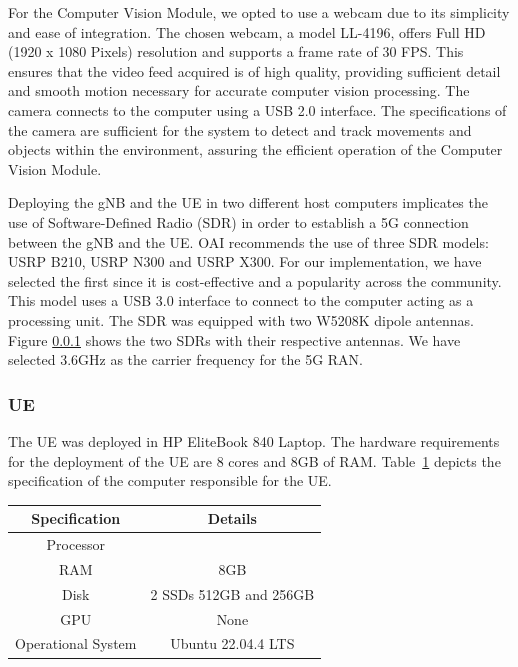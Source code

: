 For the Computer Vision Module, we opted to use a webcam due to its simplicity and ease of integration.
The chosen webcam, a model LL-4196, offers Full HD (1920 x 1080 Pixels) resolution and supports a frame rate of 30 FPS\@.
This ensures that the video feed acquired is of high quality, providing sufficient detail and smooth motion necessary for accurate computer vision processing.
The camera connects to the computer using a USB 2.0 interface.
The specifications of the camera are sufficient for the system to detect and track movements and objects within the environment, assuring the efficient operation of the Computer Vision Module.


Deploying the gNB and the UE in two different host computers implicates the use of Software-Defined Radio (SDR) in order to establish a 5G connection between the gNB and the UE.
OAI recommends the use of three SDR models: USRP B210, USRP N300 and USRP X300\@ \cite{}. %
For our implementation, we have selected the first since it is cost-effective and a popularity across the community.
This model uses a USB 3.0 interface to connect to the computer acting as a processing unit.
The SDR was equipped with two W5208K dipole antennas.
Figure \ref{} shows the two SDRs with their respective antennas.
We have selected 3.6GHz as the carrier frequency for the 5G RAN.

\subsubsection{UE}
The UE was deployed in HP EliteBook 840 Laptop.
The hardware requirements for the deployment of the UE are 8 cores and 8GB of RAM\@.
Table~\ref{tab:specs_pc_ue} depicts the specification of the computer responsible for the UE\@.

\begin{table}[H]
    \begin{tabular}{|c|c|}
        \hline
        \textbf{Specification} & \textbf{Details} \\ \hline
        Processor                      &              \\ \hline
        RAM                      &          8GB        \\ \hline
        Disk                      &   2 SSDs  512GB and 256GB         \\ \hline
        GPU                     &   None                \\ \hline
        Operational System & Ubuntu 22.04.4 LTS                  \\ \hline  %
    \end{tabular}\label{tab:specs_pc_ue}
\end{table}


